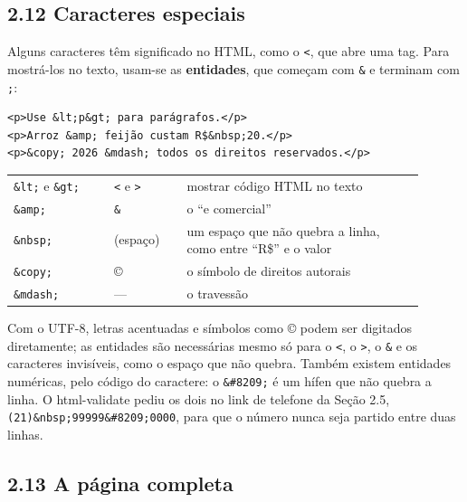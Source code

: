 \subsection{2.12 Caracteres especiais}

Alguns caracteres têm significado no HTML, como o \texttt{<}, que abre uma tag. Para mostrá-los no texto, usam-se as \textbf{entidades}, que começam com \texttt{\&} e terminam com \texttt{;}:

\begin{codigo}
\begin{Verbatim}[breaklines=true, breaksymbolleft={}, fontsize=\footnotesize]
<p>Use &lt;p&gt; para parágrafos.</p>
<p>Arroz &amp; feijão custam R$&nbsp;20.</p>
<p>&copy; 2026 &mdash; todos os direitos reservados.</p>
\end{Verbatim}
\end{codigo}

\begin{center}
\begin{tabular}{@{}P{0.22\linewidth}P{0.16\linewidth}P{0.52\linewidth}@{}}
\toprule
{}
 &  &  \\
\midrule
\texttt{\&lt;} e \texttt{\&gt;} & \texttt{<} e \texttt{>} & mostrar código HTML no texto \\
 \texttt{\&amp;} & \texttt{\&} & o ``e comercial'' \\
\texttt{\&nbsp;} & (espaço) & um espaço que não quebra a linha, como entre ``R\$'' e o valor \\
 \texttt{\&copy;} & © & o símbolo de direitos autorais \\
\texttt{\&mdash;} & — & o travessão \\
\bottomrule
\end{tabular}
\end{center}

Com o UTF-8, letras acentuadas e símbolos como © podem ser digitados diretamente; as entidades são necessárias mesmo só para o \texttt{<}, o \texttt{>}, o \texttt{\&} e os caracteres invisíveis, como o espaço que não quebra. Também existem entidades numéricas, pelo código do caractere: o \texttt{\&\#8209;} é um hífen que não quebra a linha. O html-validate pediu os dois no link de telefone da Seção 2.5, \texttt{(21)\&nbsp;99999\&\#8209;0000}, para que o número nunca seja partido entre duas linhas.

\subsection{2.13 A página completa}

